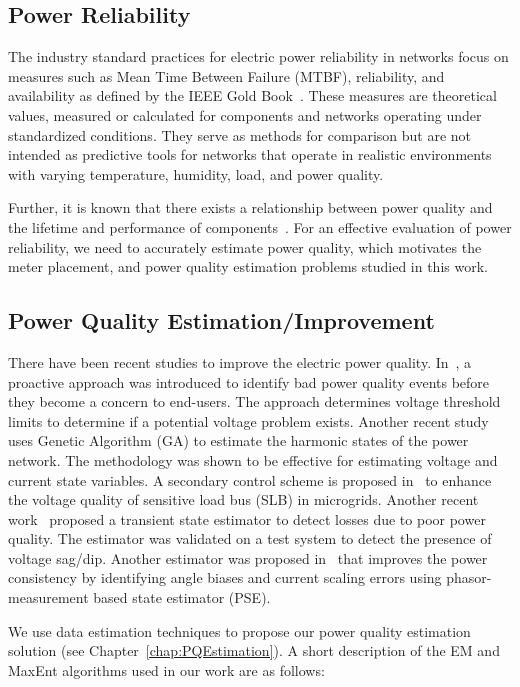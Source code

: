 \subsection{Power Reliability}
The industry standard practices for electric power reliability in networks focus on measures such as Mean Time Between Failure (MTBF), reliability, and availability as defined by the IEEE Gold Book~\cite{goldbook}. These measures are theoretical values, measured or calculated for components and networks operating under standardized conditions. They serve as methods for comparison but are not intended as predictive tools for networks that operate in realistic environments with varying temperature, humidity, load, and power quality.

Further, it is known that there exists a relationship between power quality and the lifetime and performance of components~\cite{iti_curve}. For an effective evaluation of power reliability, we need to accurately estimate power quality, which motivates the meter placement, and power quality estimation problems studied in this work.

\subsection{Power Quality Estimation/Improvement}
There have been recent studies to improve the electric power quality. In~\cite{mcbee2012utilizing}, a proactive approach was introduced to identify bad power quality events before they become a concern to end-users. The approach determines voltage threshold limits to determine if a potential voltage problem exists. Another recent study~\cite{almeida2013harmonic} uses Genetic Algorithm (GA) to estimate the harmonic states of the power network. The methodology was shown to be effective for estimating voltage and current state variables. A secondary control scheme is proposed in~\cite{savaghebi2012secondary} to enhance the voltage quality of sensitive load bus (SLB) in microgrids. Another recent work~\cite{farzanehrafat2013power} proposed a transient state estimator to detect losses due to poor power quality. The estimator was validated on a test system to detect the presence of voltage sag/dip. Another estimator was proposed in~\cite{ghiocel2014phasor} that improves the power consistency by identifying angle biases and current scaling errors using phasor-measurement based state estimator (PSE).

We use data estimation techniques to propose our power quality estimation solution (see Chapter~\ref{chap:PQEstimation}). A short description of the EM and MaxEnt algorithms used in our work are as follows:

